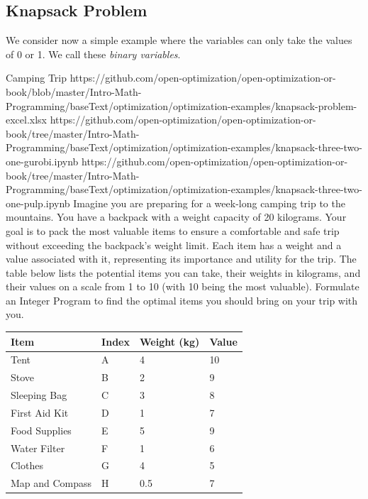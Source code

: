 \newpage
\subsection{Knapsack Problem}
We consider now a simple example where the variables can only take the values of 0 or 1.  We call these \emph{binary variables}.
\begin{examplewithallcode}{Camping Trip}
{https://github.com/open-optimization/open-optimization-or-book/blob/master/Intro-Math-Programming/baseText/optimization/optimization-examples/knapsack-problem-excel.xlsx}
{https://github.com/open-optimization/open-optimization-or-book/tree/master/Intro-Math-Programming/baseText/optimization/optimization-examples/knapsack-three-two-one-gurobi.ipynb}
{https://github.com/open-optimization/open-optimization-or-book/tree/master/Intro-Math-Programming/baseText/optimization/optimization-examples/knapsack-three-two-one-pulp.ipynb}
Imagine you are preparing for a week-long camping trip to the mountains. You have a backpack with a weight capacity of 20 kilograms. Your goal is to pack the most valuable items to ensure a comfortable and safe trip without exceeding the backpack's weight limit. Each item has a weight and a value associated with it, representing its importance and utility for the trip. The table below lists the potential items you can take, their weights in kilograms, and their values on a scale from 1 to 10 (with 10 being the most valuable).
\newline
Formulate an Integer Program to find the optimal items you should bring on your trip with you. 
\end{examplewithallcode}

\begin{table}[h!] \begin{center} \begin{tabular} {|l|l|l|l|} 
\hline Item & Index & Weight (kg) & Value  \\ \hline
\hline Tent & A & 4 & 10  \\
\hline Stove & B & 2 & 9  \\
\hline Sleeping Bag & C & 3 & 8  \\
\hline First Aid Kit & D & 1 & 7  \\
\hline Food Supplies & E & 5 & 9  \\
\hline Water Filter & F & 1 & 6  \\
\hline Clothes & G & 4 & 5  \\
\hline Map and Compass & H & 0.5 & 7  \\
\hline \end{tabular} \end{center} \end{table}

